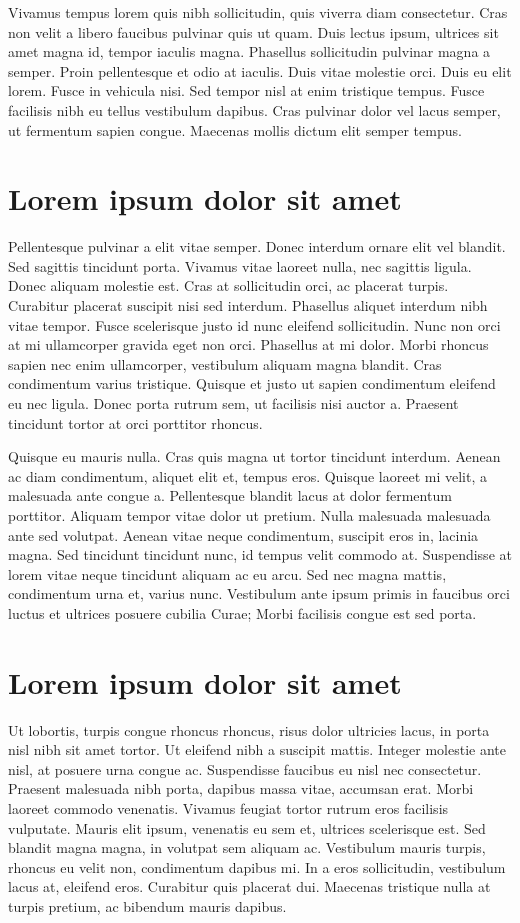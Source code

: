 \documentclass{projetofinal-dcc}
\begin{document}
Vivamus tempus lorem quis nibh sollicitudin, quis viverra diam consectetur. Cras non velit a libero faucibus pulvinar quis ut quam. Duis lectus ipsum, ultrices sit amet magna id, tempor iaculis magna. Phasellus sollicitudin pulvinar magna a semper. Proin pellentesque et odio at iaculis. Duis vitae molestie orci. Duis eu elit lorem. Fusce in vehicula nisi. Sed tempor nisl at enim tristique tempus. Fusce facilisis nibh eu tellus vestibulum dapibus. Cras pulvinar dolor vel lacus semper, ut fermentum sapien congue. Maecenas mollis dictum elit semper tempus.

\section{Lorem ipsum dolor sit amet}\label{sec:LABEL_CHP_1_SEC_G}
Pellentesque pulvinar a elit vitae semper. Donec interdum ornare elit vel blandit. Sed sagittis tincidunt porta. Vivamus vitae laoreet nulla, nec sagittis ligula. Donec aliquam molestie est. Cras at sollicitudin orci, ac placerat turpis. Curabitur placerat suscipit nisi sed interdum. Phasellus aliquet interdum nibh vitae tempor. Fusce scelerisque justo id nunc eleifend sollicitudin. Nunc non orci at mi ullamcorper gravida eget non orci. Phasellus at mi dolor. Morbi rhoncus sapien nec enim ullamcorper, vestibulum aliquam magna blandit. Cras condimentum varius tristique. Quisque et justo ut sapien condimentum eleifend eu nec ligula. Donec porta rutrum sem, ut facilisis nisi auctor a. Praesent tincidunt tortor at orci porttitor rhoncus.

Quisque eu mauris nulla. Cras quis magna ut tortor tincidunt interdum. Aenean ac diam condimentum, aliquet elit et, tempus eros. Quisque laoreet mi velit, a malesuada ante congue a. Pellentesque blandit lacus at dolor fermentum porttitor. Aliquam tempor vitae dolor ut pretium. Nulla malesuada malesuada ante sed volutpat. Aenean vitae neque condimentum, suscipit eros in, lacinia magna. Sed tincidunt tincidunt nunc, id tempus velit commodo at. Suspendisse at lorem vitae neque tincidunt aliquam ac eu arcu. Sed nec magna mattis, condimentum urna et, varius nunc. Vestibulum ante ipsum primis in faucibus orci luctus et ultrices posuere cubilia Curae; Morbi facilisis congue est sed porta.

\section{Lorem ipsum dolor sit amet}\label{sec:LABEL_CHP_1_SEC_H}
Ut lobortis, turpis congue rhoncus rhoncus, risus dolor ultricies lacus, in porta nisl nibh sit amet tortor. Ut eleifend nibh a suscipit mattis. Integer molestie ante nisl, at posuere urna congue ac. Suspendisse faucibus eu nisl nec consectetur. Praesent malesuada nibh porta, dapibus massa vitae, accumsan erat. Morbi laoreet commodo venenatis. Vivamus feugiat tortor rutrum eros facilisis vulputate. Mauris elit ipsum, venenatis eu sem et, ultrices scelerisque est. Sed blandit magna magna, in volutpat sem aliquam ac. Vestibulum mauris turpis, rhoncus eu velit non, condimentum dapibus mi. In a eros sollicitudin, vestibulum lacus at, eleifend eros. Curabitur quis placerat dui. Maecenas tristique nulla at turpis pretium, ac bibendum mauris dapibus.
\end{document}
